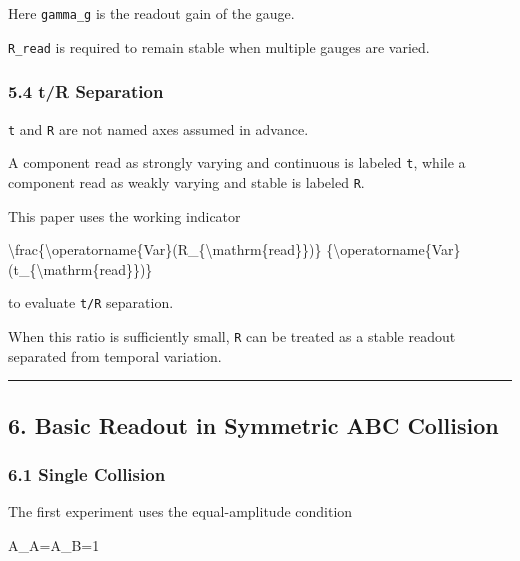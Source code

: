 \documentclass[
  a4paper,
]{article}
\newenvironment{Shaded}{}{}
\newcommand{\NormalTok}[1]{#1}
\begin{document}
Here \texttt{gamma\_g} is the readout gain of the gauge.

\texttt{R\_read} is required to remain stable when multiple gauges are
varied.

\subsubsection{5.4 t/R Separation}\label{tr-separation}

\texttt{t} and \texttt{R} are not named axes assumed in advance.

A component read as strongly varying and continuous is labeled
\texttt{t}, while a component read as weakly varying and stable is
labeled \texttt{R}.

This paper uses the working indicator

\begin{Shaded}
\begin{Highlighting}[]
\NormalTok{\textbackslash{}frac\{\textbackslash{}operatorname\{Var\}(R\_\{\textbackslash{}mathrm\{read\}\})\}}
\NormalTok{\{\textbackslash{}operatorname\{Var\}(t\_\{\textbackslash{}mathrm\{read\}\})\}}
\end{Highlighting}
\end{Shaded}

to evaluate \texttt{t/R} separation.

When this ratio is sufficiently small, \texttt{R} can be treated as a
stable readout separated from temporal variation.

\begin{center}\rule{0.5\linewidth}{0.5pt}\end{center}

\subsection{6. Basic Readout in Symmetric ABC
Collision}\label{basic-readout-in-symmetric-abc-collision}

\subsubsection{6.1 Single Collision}\label{single-collision}

The first experiment uses the equal-amplitude condition

\begin{Shaded}
\begin{Highlighting}[]
\NormalTok{A\_A=A\_B=1}
\end{Highlighting}
\end{Shaded}
\end{document}
